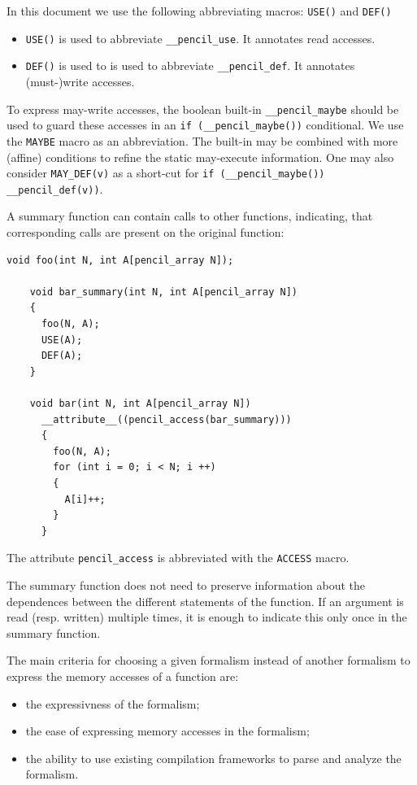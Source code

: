   In this document we use the following abbreviating macros:
  \lstinline!USE()! and \lstinline!DEF()!
  \begin{itemize}
   \item \lstinline!USE()! is used to abbreviate \lstinline!__pencil_use!.
         It annotates read accesses.
   \item \lstinline!DEF()! is used to is used to abbreviate \lstinline!__pencil_def!.
         It annotates (must-)write accesses.
  \end{itemize}

  To express may-write accesses, the boolean built-in
  \lstinline!__pencil_maybe! should be used to guard these accesses
  in an \lstinline!if (__pencil_maybe())!  conditional. We use the
  \lstinline!MAYBE! macro as an abbreviation. The
  built-in may be combined with more (affine) conditions to refine
  the static may-execute information. One may also consider
  \lstinline!MAY_DEF(v)! as a short-cut for
  \lstinline!if (__pencil_maybe()) __pencil_def(v))!.

  A summary function can contain calls to other functions, indicating,
  that corresponding calls are present on the original function:

  \begin{lstlisting}[language=pencil]
    void foo(int N, int A[pencil_array N]);

    void bar_summary(int N, int A[pencil_array N])
    {
      foo(N, A);
      USE(A);
      DEF(A);
    }

    void bar(int N, int A[pencil_array N])
      __attribute__((pencil_access(bar_summary)))
      {
        foo(N, A);
        for (int i = 0; i < N; i ++)
        {
          A[i]++;
        }
      }
  \end{lstlisting}

  The attribute \lstinline!pencil_access! is
  abbreviated with the \lstinline!ACCESS! macro.
  
  The summary function does not need to preserve information about
  the dependences between the different statements of the function.
  If an argument is read (resp. written) multiple times, it is enough
  to indicate this only once in the summary function.

  The main criteria for choosing a given formalism instead of another
  formalism to express the memory accesses of a function are:
  \begin{itemize}
   \item the expressivness of the formalism;
   \item the ease of expressing memory accesses in the formalism;
   \item the ability to use existing compilation frameworks to parse
         and analyze the formalism.
  \end{itemize}

